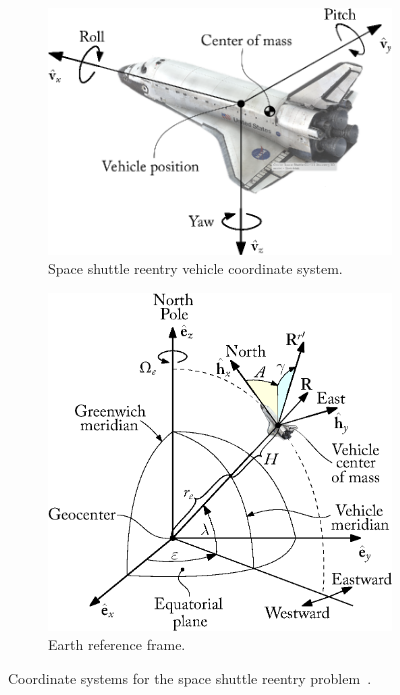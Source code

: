 \begin{figure}[htb]
  \centering
  \begin{subfigure}[c]{0.475\textwidth}
    \centering
    \includegraphics[width=1.0\linewidth]{figures/chapter_5/shuttle_frame.eps}
    \caption{Space shuttle reentry vehicle coordinate system.}
    \label{chap5:fig:shuttle_frame}
  \end{subfigure}%
  \hfill
  \begin{subfigure}[c]{0.475\textwidth}
    \centering
    \includegraphics[width=1.0\linewidth]{figures/chapter_5/earth_frame.eps}
    \caption{Earth reference frame.}
    \label{chap5:fig:earth_frame}
  \end{subfigure}
  \caption{Coordinate systems for the space shuttle reentry problem~\cite{brenan1995numerical, brenan1986numerical}.}
  \label{chap5:fig:shuttle_reentry}
\end{figure}

